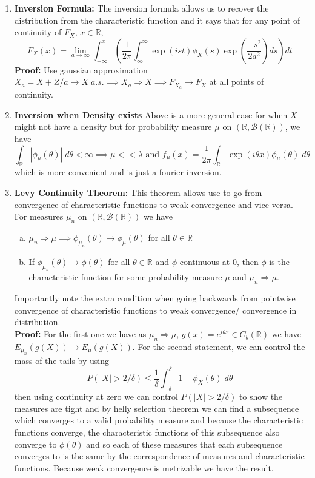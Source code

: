 \documentclass{article}
\begin{document}
\begin{enumerate}
    \item \textbf{Inversion Formula:} The inversion formula allows us to recover the distribution from the characteristic function and it says that for any point of continuity of \(F_X\), \(x \in \mathbb{R}\),
    \[
    F_X(x) = \lim_{a \to \infty} \int^x_{-\infty} \left( \frac{1}{2 \pi} \int_{\infty}^{\infty} \exp(ist) \phi_X(s)\exp\left(\frac{-s^2}{2a^2}\right)ds \right) dt
    \]
    \textbf{Proof:} Use gaussian approximation \(X_a = X + Z/a \to X \; a.s. \implies X_a \Rightarrow X \implies F_{X_a} \to F_X\) at all points of continuity.

    \item \textbf{Inversion when Density exists} Above is a more general case for when \(X\) might not have a density but for probability measure \(\mu\) on \((\mathbb{R}, \mathcal{B}(\mathbb{R}))\), we have
    \[
    \int_\mathbb{R} |\phi_\mu(\theta)| \;d\theta < \infty \implies \mu <<\lambda \text{ and } f_\mu(x) = \frac{1}{2\pi} \int_\mathbb{R} \exp(i\theta x) \phi_\mu(\theta) \; d\theta
    \]
    which is more convenient and is just a fourier inversion.

    \item \textbf{Levy Continuity Theorem:} This theorem allows use to go from convergence of characteristic functions to weak convergence and vice versa. For measures \(\mu_n\) on \((\mathbb{R}, \mathcal{B}(\mathbb{R}))\) we have
    \begin{enumerate}[a.]
        \item \(\mu_n \Rightarrow\mu \implies \phi_{\mu_n}(\theta) \to \phi_\mu(\theta)\) for all \(\theta \in \mathbb{R}\) 
        \item If  \(\phi_{\mu_n}(\theta) \to \phi(\theta)\) for all \(\theta \in \mathbb{R}\) and \(\phi\) continuous at 0, then \(\phi\) is the characteristic function for some probability measure \(\mu\) and \(\mu_n \Rightarrow \mu\).
    \end{enumerate}
    Importantly note the extra condition when going backwards from pointwise convergence of characteristic functions to weak convergence/ convergence in distribution.\\

    \textbf{Proof:} For the first one we have as \(\mu_n \Rightarrow \mu\), \(g(x) = e^{i\theta x} \in C_b(\mathbb{R})\) we have \(E_{\mu_n}(g(X)) \to E_{\mu}(g(X))\). For the second statement, we can control the mass of the tails by using
    \[
    P(|X|>2/\delta) \leq \frac{1}{\delta} \int_{-\delta}^{\delta}1 - \phi_X(\theta) \; d\theta
    \]
    then using continuity at zero we can control \(P(|X|>2/\delta)\) to show the measures are tight and by helly selection theorem we can find a subsequence which converges to a valid probability measure and because the characteristic functions converge, the characteristic functions of this subsequence also converge to \(\phi(\theta)\) and so each of these measures that each subsequence converges to is the same by the correspondence of measures and characteristic functions. Because weak convergence is metrizable we have the result.


\end{enumerate}
\end{document}
